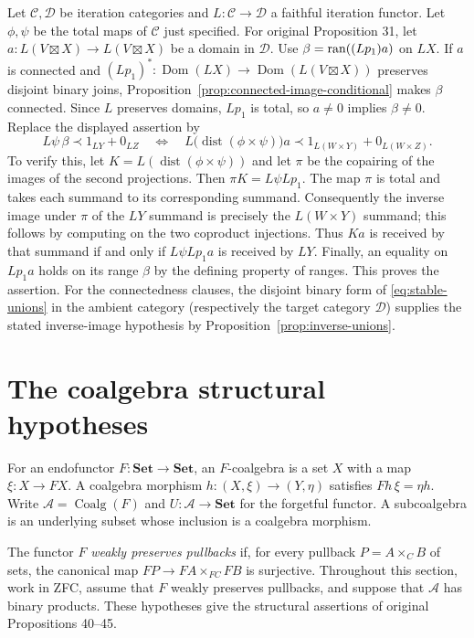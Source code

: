 \documentclass[11pt]{article}
\newcommand{\C}{\mathcal C}\newcommand{\D}{\mathcal D}\newcommand{\B}{\mathcal B}
\newcommand{\dist}{\operatorname{dist}}\newcommand{\ass}{\operatorname{ass}}
\begin{document}
Let $\C,\D$ be iteration categories and $L:\C\to\D$ a faithful iteration functor. Let $\phi,\psi$ be the total maps of $\C$ just specified. For original Proposition 31, let $a:L(V\boxtimes X)\to L(V\boxtimes X)$ be a domain in $\D$. Use $\beta=\operatorname{ran}((Lp_1)a)$ on $LX$. If $a$ is connected and $(Lp_1)^*:\operatorname{Dom}(LX)\to\operatorname{Dom}(L(V\boxtimes X))$ preserves disjoint binary joins, Proposition~\ref{prop:connected-image-conditional} makes $\beta$ connected. Since $L$ preserves domains, $Lp_1$ is total, so $a\ne0$ implies $\beta\ne0$. Replace the displayed assertion by
\[
L\psi\,\beta\prec1_{LY}+0_{LZ}
\quad\Longleftrightarrow\quad
L\bigl(\dist(\phi\times\psi)\bigr)a
 \prec1_{L(W\times Y)}+0_{L(W\times Z)}.
\]
To verify this, let $K=L(\dist(\phi\times\psi))$ and let $\pi$ be the copairing of the images of the second projections. Then $\pi K=L\psi Lp_1$. The map $\pi$ is total and takes each summand to its corresponding summand. Consequently the inverse image under $\pi$ of the $LY$ summand is precisely the $L(W\times Y)$ summand; this follows by computing on the two coproduct injections. Thus $Ka$ is received by that summand if and only if $L\psi Lp_1a$ is received by $LY$. Finally, an equality on $Lp_1a$ holds on its range $\beta$ by the defining property of ranges. This proves the assertion. For the connectedness clauses, the disjoint binary form of \eqref{eq:stable-unions} in the ambient category (respectively the target category $\D$) supplies the stated inverse-image hypothesis by Proposition~\ref{prop:inverse-unions}.

\section{The coalgebra structural hypotheses}\label{sec:coalgebra-structure}
For an endofunctor $F:\mathbf{Set}\to\mathbf{Set}$, an $F$-coalgebra is a set $X$ with a map $\xi:X\to FX$. A coalgebra morphism $h:(X,\xi)\to(Y,\eta)$ satisfies $Fh\,\xi=\eta h$. Write $\mathcal A=\operatorname{Coalg}(F)$ and $U:\mathcal A\to\mathbf{Set}$ for the forgetful functor. A subcoalgebra is an underlying subset whose inclusion is a coalgebra morphism.

The functor $F$ \emph{weakly preserves pullbacks} if, for every pullback $P=A\times_C B$ of sets, the canonical map $FP\to FA\times_{FC}FB$ is surjective. Throughout this section, work in ZFC, assume that $F$ weakly preserves pullbacks, and suppose that $\mathcal A$ has binary products. These hypotheses give the structural assertions of original Propositions 40--45.
\end{document}
